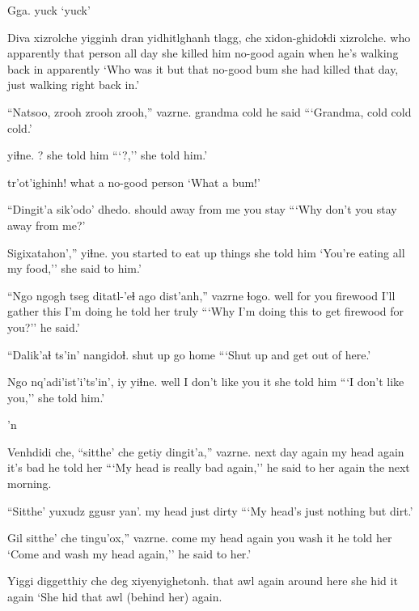 \documentclass[12pt]{article}
\begin{document}
\gll Gga.
yuck
\glt `yuck'
\glend

\gll Diva xizrolche yigginh dran yidhitlghanh tlagg, che xidon-ghidoɬdi xizrolche.
who apparently {that person} {all day} {she killed him} no-good again {when he's walking back in} apparently
\glt `Who was it but that no-good bum she had killed that day, just walking right back in.'
\glend

\gll ``Natsoo, zrooh zrooh zrooh,'' vazrne.
grandma cold {} {} {he said}
\glt ```Grandma, cold cold cold.'
\glend

 yiɬne.
? {she told him}
\glt ```?,'' she told him.'
\glend

 tr'ot'ighinh! 
{what a} {no-good person}
\glt `What a bum!'
\glend

\gll ``Dingit'a {sik'odo'} dhedo. 
should {away from me} {you stay}
\glt ```Why don't you stay away from me?'
\glend

\gll Sigixatahon','' yiɬne.
{you started to eat up things} {she told him}
\glt `You're eating all my food,'' she said to him.'
\glend

\gll ``Ngo ngogh tseg ditatl-'eɬ ago dist'anh,'' vazrne ɬogo.
well {for you} firewood {I'll gather} this {I'm doing} {he told her} truly
\glt ```Why I'm doing this to get firewood for you?'' he said.'
\glend

\gll ``Dalik'aɬ ts'in' nangidoɬ. 
{shut up} {} {go home} 
\glt ```Shut up and get out of here.'
\glend

\gll Ngo nq'adi'ist'i'ts'in', iy yiɬne.
well {I don't like you} it {she told him}
\glt ```I don't like you,'' she told him.'
\glend

'n

\gll Venhdidi che, ``sitthe' che {getiy dingit'a,''} vazrne.
{next day} again {my head} again {it's bad} {he told her}
\glt ```My head is really bad again,'' he said to her again the next morning.
\glend

\gll ``Sitthe' yuxudz {ggusr yan'. }
{my head} just dirty
\glt ```My head's just nothing but dirt.'
\glend

\gll Gil sitthe' che tingu'ox,'' vazrne.
come {my head} again {you wash it} {he told her}
\glt `Come and wash my head again,'' he said to her.'
\glend

\gll Yiggi diggetthiy che deg xiyenyighetonh. 
that awl again {around here} {she hid it again}
\glt `She hid that awl (behind her) again.
\glend
\end{document}
